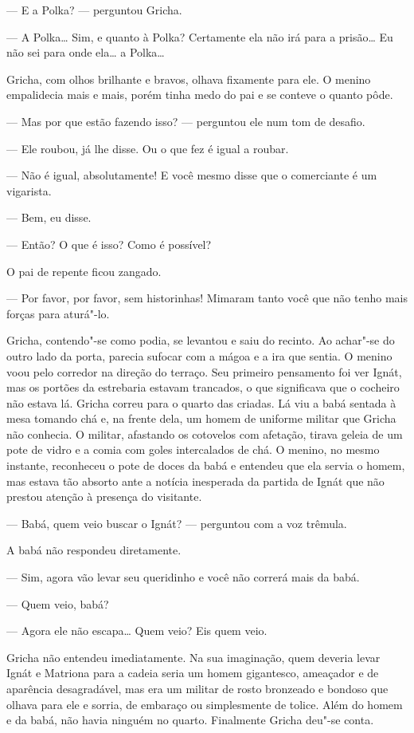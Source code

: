 --- E a Polka? --- perguntou Gricha.

--- A Polka\ldots{} Sim, e quanto à Polka? Certamente ela não irá para a
prisão\ldots{} Eu não sei para onde ela\ldots{} a Polka\ldots{}

Gricha, com olhos brilhante e bravos, olhava fixamente para ele. O
menino empalidecia mais e mais, porém tinha medo do pai e se conteve o
quanto pôde.

--- Mas por que estão fazendo isso? --- perguntou ele num tom de
desafio.

--- Ele roubou, já lhe disse. Ou o que fez é igual a roubar.

--- Não é igual, absolutamente! E você mesmo disse que o comerciante é
um vigarista.

--- Bem, eu disse.

--- Então? O que é isso? Como é possível?

O pai de repente ficou zangado.

--- Por favor, por favor, sem historinhas! Mimaram tanto você que não
tenho mais forças para aturá"-lo.

Gricha, contendo"-se como podia, se levantou e saiu do recinto. Ao achar"-se
do outro lado da porta, parecia sufocar com a mágoa e a ira que sentia.
O menino voou pelo corredor na direção do terraço. Seu primeiro
pensamento foi ver Ignát, mas os portões da estrebaria estavam
trancados, o que significava que o cocheiro não estava lá. Gricha correu
para o quarto das criadas. Lá viu a babá sentada à mesa tomando chá e,
na frente dela, um homem de uniforme militar que Gricha não conhecia. O
militar, afastando os cotovelos com afetação, tirava geleia de um pote
de vidro e a comia com goles intercalados de chá. O menino, no mesmo
instante, reconheceu o pote de doces da babá e entendeu que ela servia o
homem, mas estava tão absorto ante a notícia inesperada da partida de
Ignát que não prestou atenção à presença do visitante.

--- Babá, quem veio buscar o Ignát? --- perguntou com a voz trêmula.

A babá não respondeu diretamente.

--- Sim, agora vão levar seu queridinho e você não correrá mais da babá.

--- Quem veio, babá?

--- Agora ele não escapa\ldots{} Quem veio? Eis quem veio.

Gricha não entendeu imediatamente. Na sua imaginação, quem deveria levar
Ignát e Matriona para a cadeia seria um homem gigantesco, ameaçador e de
aparência desagradável, mas era um militar de rosto
bronzeado e bondoso que olhava para ele e sorria, de embaraço ou simplesmente de tolice.
Além do homem e da babá, não havia ninguém no quarto. Finalmente Gricha
deu"-se conta.

